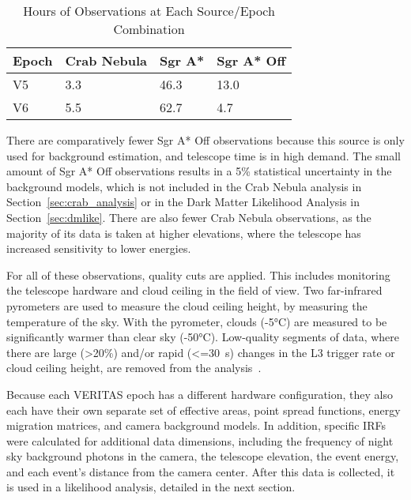 \begin{table}[!ht]
  \centering
  \caption{Hours of Observations at Each Source/Epoch Combination}
  \label{tab:observation_times}
  \begin{tabular}{|l|l|l|l|}
    \hline
    \textbf{Epoch} & \textbf{Crab Nebula} & \textbf{Sgr A*} & \textbf{Sgr A* Off} \\ \hline
    V5             & 3.3                  & 46.3            & 13.0                \\ \hline
    V6             & 5.5                  & 62.7            & 4.7                 \\ \hline
  \end{tabular}
\end{table}


There are comparatively fewer Sgr A* Off observations because this source is only used for background estimation, and telescope time is in high demand.
The small amount of Sgr A* Off observations results in a \nicetilde{}5\% statistical uncertainty in the background models, which is not included in the Crab Nebula analysis in Section~\ref{sec:crab_analysis} or in the Dark Matter Likelihood Analysis in Section~\ref{sec:dmlike}.
There are also fewer Crab Nebula observations, as the majority of its data is taken at higher elevations, where the telescope has increased sensitivity to lower energies.

For all of these observations, quality cuts are applied.
This includes monitoring the telescope hardware and cloud ceiling in the field of view.
Two far-infrared pyrometers are used to measure the cloud ceiling height, by measuring the temperature of the sky.
With the pyrometer, clouds (\nicetilde\ang{-5}C) are measured to be significantly warmer than clear sky (\nicetilde\ang{-50}C).
Low-quality segments of data, where there are large (>20\%) and/or rapid (<=\SI{30}{s}) changes in the L3 trigger rate or cloud ceiling height, are removed from the analysis~\cite{bird_weather}.

Because each VERITAS epoch has a different hardware configuration, they also each have their own separate set of effective areas, point spread functions, energy migration matrices, and camera background models.
In addition, specific IRFs were calculated for additional data dimensions, including the frequency of night sky background photons in the camera, the telescope elevation, the event energy, and each event's distance from the camera center.
After this data is collected, it is used in a likelihood analysis, detailed in the next section.


